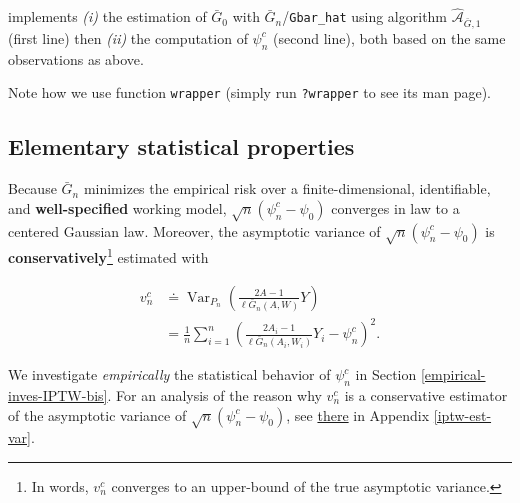 \documentclass[11pt,openright,twoside]{book}
\newenvironment{Shaded}{\begin{snugshade}}{\end{snugshade}}
\newcommand{\CommentTok}[1]{\textcolor[rgb]{0.56,0.35,0.01}{\textit{#1}}}
\newcommand{\FloatTok}[1]{\textcolor[rgb]{0.00,0.00,0.81}{#1}}
\newcommand{\KeywordTok}[1]{\textcolor[rgb]{0.13,0.29,0.53}{\textbf{#1}}}
\newcommand{\NormalTok}[1]{#1}
\newcommand{\OperatorTok}[1]{\textcolor[rgb]{0.81,0.36,0.00}{\textbf{#1}}}
\newcommand{\StringTok}[1]{\textcolor[rgb]{0.31,0.60,0.02}{#1}}
\DeclareMathOperator{\Var}{Var}
\newcommand{\Algo}{\widehat{\mathcal{A}}}
\newcommand{\defq}{\doteq}
\newcommand{\Gbar}{\bar{G}}
\theoremstyle{definition}
\theoremstyle{definition}
\theoremstyle{definition}
\theoremstyle{remark}
\begin{document}
\begin{Shaded}
\end{Shaded}

implements \emph{(i)} the estimation of \(\Gbar_{0}\) with \(\Gbar_{n}\)/\texttt{Gbar\_hat}
using algorithm \(\Algo_{\Gbar,1}\) (first line) then \emph{(ii)} the computation of
\(\psi_{n}^{c}\) (second line), both based on the same observations as above.

Note how we use function \texttt{wrapper} (simply run \texttt{?wrapper} to see its man
page).

\hypertarget{elementary-stat-prop-iptw}{%
\subsection{Elementary statistical properties}\label{elementary-stat-prop-iptw}}

Because \(\Gbar_{n}\) minimizes the empirical risk over a finite-dimensional,
identifiable, and \textbf{well-specified} working model, \(\sqrt{n} (\psi_{n}^{c} - \psi_{0})\) converges in law to a centered Gaussian law.
Moreover, the asymptotic variance of \(\sqrt{n} (\psi_{n}^{c} - \psi_{0})\) is
\textbf{conservatively}\footnote{In words, \(v_{n}^{c}\) converges to an upper-bound of the
  true asymptotic variance.} estimated
with

\begin{align*}            v_{n}^{c}            &\defq            \Var_{P_{n}}
\left(\frac{2A-1}{\ell\Gbar_{n}(A,W)}Y\right)      \\      &=      \frac{1}{n}
\sum_{i=1}^{n}\left(\frac{2A_{i}-1}{\ell\Gbar_{n}   (A_{i},W_{i})}   Y_{i}   -
\psi_{n}^{c}\right)^{2}.  \end{align*}

We investigate \emph{empirically} the statistical behavior of \(\psi_{n}^{c}\) in
Section \ref{empirical-inves-IPTW-bis}. For an analysis of the reason why
\(v_{n}^{c}\) is a conservative estimator of the asymptotic variance of
\(\sqrt{n} (\psi_{n}^{c} - \psi_{0})\), see \protect\hyperlink{iptw-est-var}{there} in Appendix
\ref{iptw-est-var}.
\end{document}
